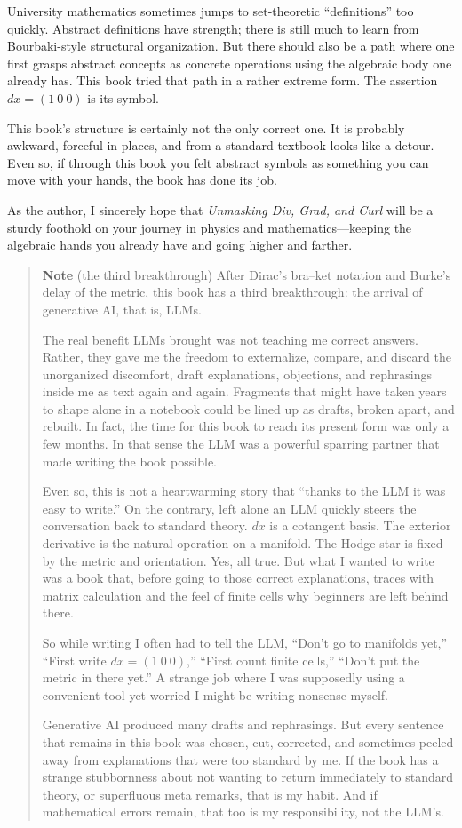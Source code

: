 \documentclass[a4paper,12pt,openany]{book}
\begin{document}
University mathematics sometimes jumps to set-theoretic ``definitions''
too quickly. Abstract definitions have strength; there is still much to
learn from Bourbaki-style structural organization. But there should also
be a path where one first grasps abstract concepts as concrete
operations using the algebraic body one already has. This book tried
that path in a rather extreme form. The assertion \(dx=(1\ 0\ 0)\) is
its symbol.

This book's structure is certainly not the only correct one. It is
probably awkward, forceful in places, and from a standard textbook looks
like a detour. Even so, if through this book you felt abstract symbols
as something you can move with your hands, the book has done its job.

As the author, I sincerely hope that \emph{Unmasking Div, Grad, and
Curl} will be a sturdy foothold on your journey in physics and
mathematics—keeping the algebraic hands you already have and going
higher and farther.

\begin{quote}
\textbf{Note} (the third breakthrough) After Dirac's bra–ket notation
and Burke's delay of the metric, this book has a third breakthrough: the
arrival of generative AI, that is, LLMs.

The real benefit LLMs brought was not teaching me correct answers.
Rather, they gave me the freedom to externalize, compare, and discard
the unorganized discomfort, draft explanations, objections, and
rephrasings inside me as text again and again. Fragments that might have
taken years to shape alone in a notebook could be lined up as drafts,
broken apart, and rebuilt. In fact, the time for this book to reach its
present form was only a few months. In that sense the LLM was a powerful
sparring partner that made writing the book possible.

Even so, this is not a heartwarming story that ``thanks to the LLM it
was easy to write.'' On the contrary, left alone an LLM quickly steers
the conversation back to standard theory. \(dx\) is a cotangent basis.
The exterior derivative is the natural operation on a manifold. The
Hodge star is fixed by the metric and orientation. Yes, all true. But
what I wanted to write was a book that, before going to those correct
explanations, traces with matrix calculation and the feel of finite
cells why beginners are left behind there.

So while writing I often had to tell the LLM, ``Don't go to manifolds
yet,'' ``First write \(dx=(1\ 0\ 0)\),'' ``First count finite cells,''
``Don't put the metric in there yet.'' A strange job where I was
supposedly using a convenient tool yet worried I might be writing
nonsense myself.

Generative AI produced many drafts and rephrasings. But every sentence
that remains in this book was chosen, cut, corrected, and sometimes
peeled away from explanations that were too standard by me. If the book
has a strange stubbornness about not wanting to return immediately to
standard theory, or superfluous meta remarks, that is my habit. And if
mathematical errors remain, that too is my responsibility, not the
LLM's.
\end{quote}
\end{document}
